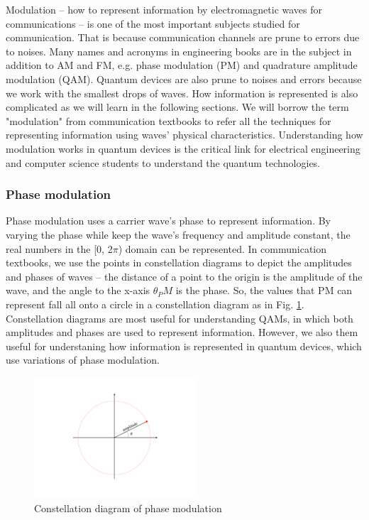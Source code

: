 \documentclass{book}
\begin{document}
Modulation -- how to represent information by electromagnetic waves for communications -- is one of the most important subjects studied for communication. That is because communication channels are prune to errors due to noises. Many names and acronyms in engineering books are in the subject in addition to AM and FM, e.g. phase modulation (PM) and quadrature amplitude modulation (QAM). Quantum devices are also prune to noises and errors because we work with the smallest drops of waves. How information is represented is also complicated as we will learn in the following sections. We will borrow the term "modulation" from communication textbooks to refer all the techniques for representing information using waves' physical characteristics. Understanding how modulation works in quantum devices is the critical link for electrical engineering and computer science students to understand the quantum technologies. 

\subsubsection{Phase modulation}
Phase modulation uses a carrier wave's phase to represent information. By varying the phase while keep the wave's frequency and amplitude constant, the real numbers in the [0, 2$\pi$) domain can be represented. In communication textbooks, we use the points in constellation diagrams to depict the amplitudes and phases of waves -- 
the distance of a point to the origin is the amplitude of the wave, and the angle to the x-axis $\theta_PM$ is the phase. 
So, the values that PM can represent fall all onto a circle in a constellation diagram as in Fig. \ref{PM}. Constellation diagrams are most useful for understanding QAMs, in which both amplitudes and phases are used to represent information. However, we also them useful for understaning how information is represented in quantum devices, which use variations of phase modulation.

\begin{figure}[ht]
\includegraphics[width=6cm]{pic/PM.pdf}
\caption{Constellation diagram of phase modulation}
\label{PM}
\end{figure}
\end{document}

